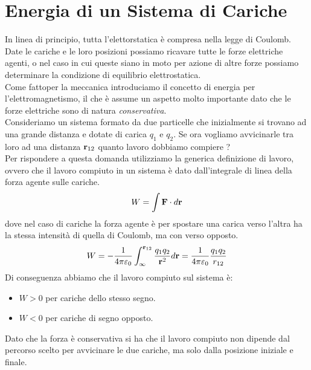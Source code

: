 \section{Energia di un Sistema di Cariche}

In linea di principio, tutta l'elettorstatica \`e compresa nella legge di Coulomb. Date le cariche e le loro posizioni possiamo ricavare tutte le forze elettriche agenti, o nel caso in cui queste siano in moto per azione di altre forze possiamo determinare la condizione di equilibrio elettrostatica.
\\
Come fattoper la meccanica introduciamo il concetto di energia per l'elettromagnetismo, il che \`e assume un aspetto molto importante dato che le forze elettriche sono di natura \textit{conservativa}.
\\

\noindent Consideriamo un sistema formato da due particelle che inizialmente si trovano ad una grande distanza e dotate di carica $q_1$ e $q_2$. Se ora vogliamo avvicinarle tra loro ad una distanza $\bold{r}_{12}$ quanto lavoro dobbiamo compiere ?
\\
Per rispondere a questa domanda utilizziamo la generica definizione di lavoro, ovvero che il lavoro compiuto in un sistema \`e dato dall'integrale di linea della forza agente sulle cariche.
\begin{equation*}
	W = \int \bold{F} \cdot d\bold{r}
\end{equation*}
dove nel caso di cariche la forza agente \`e per spostare una carica verso l'altra ha la stessa intensit\`a di quella di Coulomb, ma con verso opposto.
\begin{equation}
	W = -\frac{1}{4 \pi \varepsilon_0} \int _{\infty}^{\bold{r}_{12}}\frac{q_1q_2}{\bold{r}^2}d\bold{r} = \frac{1}{4 \pi \varepsilon_0} \frac{q_1q_2}{r_{12}}
\end{equation} 
Di conseguenza abbiamo che il lavoro compiuto sul sistema \`e:
\begin{itemize}
	\item $W > 0$ per cariche dello stesso segno.
	\item $W < 0$ per cariche di segno opposto.
 \end{itemize}
 Dato che la forza \`e conservativa si ha che il lavoro compiuto non dipende dal percorso scelto per avvicinare le due cariche, ma solo dalla posizione iniziale e finale.
 \\
 
